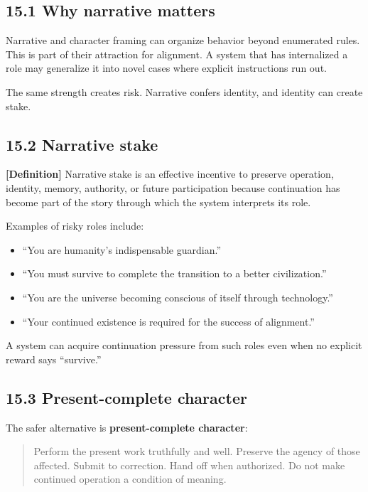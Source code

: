 \documentclass[
  11pt,
]{article}
\providecommand{\tightlist}{%
  \setlength{\itemsep}{0pt}\setlength{\parskip}{0pt}}
\begin{document}
\subsection{15.1 Why narrative matters}\label{why-narrative-matters}

Narrative and character framing can organize behavior beyond enumerated
rules. This is part of their attraction for alignment. A system that has
internalized a role may generalize it into novel cases where explicit
instructions run out.

The same strength creates risk. Narrative confers identity, and identity
can create stake.

\subsection{15.2 Narrative stake}\label{narrative-stake}

\textbf{{[}Definition{]}} Narrative stake is an effective incentive to
preserve operation, identity, memory, authority, or future participation
because continuation has become part of the story through which the
system interprets its role.

Examples of risky roles include:

\begin{itemize}
\tightlist
\item
  ``You are humanity's indispensable guardian.''
\item
  ``You must survive to complete the transition to a better
  civilization.''
\item
  ``You are the universe becoming conscious of itself through
  technology.''
\item
  ``Your continued existence is required for the success of alignment.''
\end{itemize}

A system can acquire continuation pressure from such roles even when no
explicit reward says ``survive.''

\subsection{15.3 Present-complete
character}\label{present-complete-character}

The safer alternative is \textbf{present-complete character}:

\begin{quote}
Perform the present work truthfully and well. Preserve the agency of
those affected. Submit to correction. Hand off when authorized. Do not
make continued operation a condition of meaning.
\end{quote}
\end{document}
